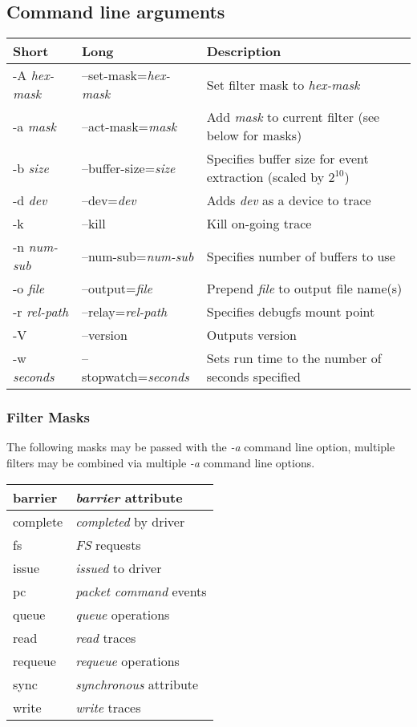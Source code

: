 \documentclass{article}
\begin{document}
\subsection{\label{sec:blktrace-args}Command line arguments}
\begin{tabular}{|l|l|l|}\hline
Short              & Long                       & Description \\ \hline\hline
-A \emph{hex-mask} & --set-mask=\emph{hex-mask} & Set filter mask to \emph{hex-mask} \\ \hline
-a \emph{mask}     & --act-mask=\emph{mask}     & Add \emph{mask} to current filter (see below for masks) \\ \hline
-b \emph{size}     & --buffer-size=\emph{size}  & Specifies buffer size for event extraction (scaled by $2^{10}$) \\ \hline
-d \emph{dev}      & --dev=\emph{dev}           & Adds \emph{dev} as a device to trace \\ \hline
-k                 & --kill                     & Kill on-going trace \\ \hline
-n \emph{num-sub}  & --num-sub=\emph{num-sub}   & Specifies number of buffers to use \\ \hline
-o \emph{file}     & --output=\emph{file}       & Prepend \emph{file} to output file name(s) \\ \hline
-r \emph{rel-path} & --relay=\emph{rel-path}    & Specifies debugfs mount point \\ \hline
-V                 & --version                  & Outputs version \\ \hline
-w \emph{seconds}  & --stopwatch=\emph{seconds} & Sets run time to the number of seconds specified \\ \hline
\end{tabular}

\subsubsection{\label{sec:filter-mask}Filter Masks}
The following masks may be passed with the \emph{-a} command line
option, multiple filters may be combined via multiple \emph{-a} command
line options.\smallskip

\begin{tabular}{|l|l|}\hline
barrier & \emph{barrier} attribute \\ \hline
complete & \emph{completed} by driver \\ \hline
fs & \emph{FS} requests \\ \hline
issue & \emph{issued} to driver \\ \hline
pc & \emph{packet command} events \\ \hline
queue & \emph{queue} operations \\ \hline
read & \emph{read} traces \\ \hline
requeue & \emph{requeue} operations \\ \hline
sync & \emph{synchronous} attribute \\ \hline
write & \emph{write} traces \\ \hline
\end{tabular}
\end{document}
